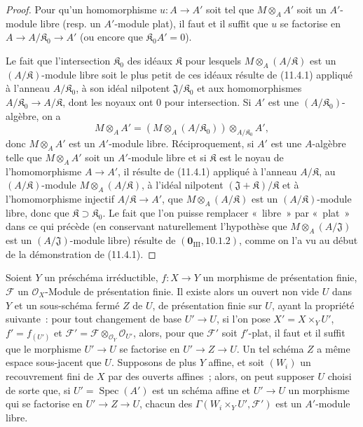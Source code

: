 \begin{proof}
Pour qu'un homomorphisme $u:A\to A'$ soit tel que $M\otimes_A A'$ soit un
$A'$-module libre (resp. un $A'$-module plat), il faut et il suffit que $u$ se
factorise en $A\to A/\mathfrak K_0\to A'$ (ou encore que
$\mathfrak K_0A'=0$).

Le fait que l'intersection $\mathfrak K_0$ des idéaux $\mathfrak K$ pour
lesquels $M\otimes_A(A/\mathfrak K)$ est un $(A/\mathfrak K)$-module libre
soit le plus petit de ces idéaux résulte de (11.4.1) appliqué à l'anneau
$A/\mathfrak K_0$, à son idéal nilpotent $\mathfrak J/\mathfrak K_0$ et aux
homomorphismes $A/\mathfrak K_0\to A/\mathfrak K$, dont les noyaux ont $0$
pour intersection. Si $A'$ est une $(A/\mathfrak K_0)$-algèbre, on a
\[
M\otimes_A A'=
(M\otimes_A(A/\mathfrak K_0))\otimes_{A/\mathfrak K_0}A',
\]
donc $M\otimes_A A'$ est un $A'$-module libre. Réciproquement, si $A'$ est
une $A$-algèbre telle que $M\otimes_A A'$ soit un $A'$-module libre et si
$\mathfrak K$ est le noyau de l'homomorphisme $A\to A'$, il résulte de
(11.4.1) appliqué à l'anneau $A/\mathfrak K$, au
$(A/\mathfrak K)$-module $M\otimes_A(A/\mathfrak K)$, à l'idéal nilpotent
$(\mathfrak J+\mathfrak K)/\mathfrak K$ et à l'homomorphisme injectif
$A/\mathfrak K\to A'$, que $M\otimes_A(A/\mathfrak K)$ est un
$(A/\mathfrak K)$-module libre, donc que $\mathfrak K\supset\mathfrak K_0$.
Le fait que l'on puisse remplacer «~libre~» par «~plat~» dans ce qui précède
(en conservant naturellement l'hypothèse que $M\otimes_A(A/\mathfrak J)$ est
un $(A/\mathfrak J)$-module libre) résulte de
$(\mathbf 0_{\mathrm{III}},10.1.2)$, comme on l'a vu au début de la
démonstration de (11.4.1).
\end{proof}

\begin{proposition}[11.4.5]
\label{IV.11.4.5-fr}
Soient $Y$ un préschéma irréductible, $f:X\to Y$ un morphisme de présentation
finie, $\mathcal F$ un $\mathcal O_X$-Module de présentation finie. Il existe
alors un ouvert non vide $U$ dans $Y$ et un sous-schéma fermé $Z$ de $U$, de
présentation finie sur $U$, ayant la propriété suivante~: pour tout changement
de base $U'\to U$, si l'on pose $X'=X\times_YU'$, $f'=f_{(U')}$ et
$\mathcal F'=\mathcal F\otimes_{\mathcal O_Y}\mathcal O_{U'}$, alors, pour que
$\mathcal F'$ soit $f'$-plat, il faut et il suffit que le morphisme $U'\to U$
se factorise en $U'\to Z\to U$. Un tel schéma $Z$ a même espace sous-jacent que
$U$. Supposons de plus $Y$ affine, et soit $(W_i)$ un recouvrement fini de $X$
par des ouverts affines~; alors, on peut supposer $U$ choisi de sorte que, si
$U'=\operatorname{Spec}(A')$ est un schéma affine et $U'\to U$ un morphisme qui
se factorise en $U'\to Z\to U$, chacun des
$\Gamma(W_i\times_YU',\mathcal F')$ est un $A'$-module libre.
\end{proposition}


